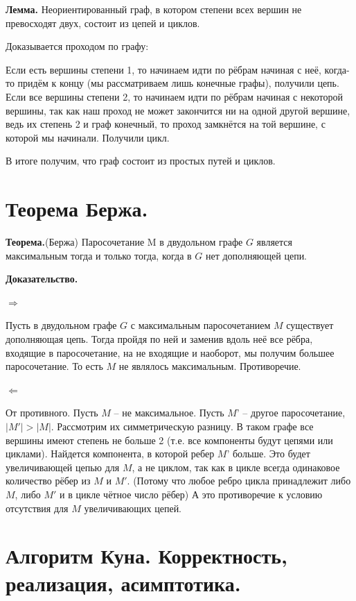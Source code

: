     \textbf{Лемма.} Неориентированный граф, в котором степени всех вершин не превосходят двух, состоит из цепей и циклов.
    
    Доказывается проходом по графу:
    
    Если есть вершины степени 1, то начинаем идти по рёбрам начиная с неё, когда-то придём к концу (мы рассматриваем лишь конечные графы), получили цепь. Если все вершины степени 2, то начинаем идти по рёбрам начиная с некоторой вершины, так как наш проход не может закончится ни на одной другой вершине, ведь их степень 2 и граф конечный, то проход замкнётся на той вершине, с которой мы начинали. Получили цикл. 
    
    В итоге получим, что граф состоит из простых путей и циклов.

\setcounter{section}{65}
\section{Теорема Бержа.}

    \textbf{Теорема.}(Бержа) Паросочетание M в двудольном графе $G$ является максимальным тогда и только тогда, когда в $G$ нет дополняющей цепи.
    
    \textbf{Доказательство.}
    
        $\Rightarrow$
    
        Пусть в двудольном графе $G$ с максимальным паросочетанием $M$ существует дополняющая цепь. Тогда пройдя по ней и заменив вдоль неё все рёбра, входящие в паросочетание, на не входящие и наоборот, мы получим большее паросочетание. То есть $M$ не являлось максимальным. Противоречие.
            
        $\Leftarrow$
        
        От противного. Пусть $M$ – не максимальное. Пусть $M’$ – другое паросочетание, $|M'| > |M|$. Рассмотрим их симметрическую разницу. В таком графе все вершины имеют степень не больше 2 (т.е. все компоненты будут цепями или циклами). Найдется компонента, в которой ребер $M’$ больше. Это будет увеличивающей цепью для $M$, а не циклом, так как в цикле всегда одинаковое количество рёбер из $M$ и $M'$. (Потому что любое ребро цикла принадлежит либо $M$, либо $M'$ и в цикле чётное число рёбер) А это противоречие к условию отсутствия для $M$ увеличивающих цепей.

\setcounter{section}{66}
\section{Алгоритм Куна. Корректность, реализация, асимптотика.}

